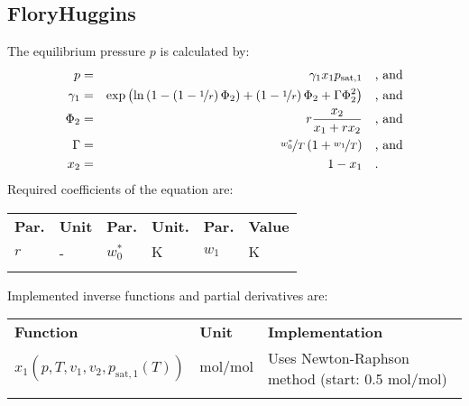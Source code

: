 \subsection{FloryHuggins}
\label{cha:approaches:abs:act:flory_huggins}
%
The equilibrium pressure $p$ is calculated by:
%
\begin{equation*}
	\begin{split}
		p &=& \gamma_1 x_1 p_\mathrm{sat,1} & \quad\text{, and} \\
		\gamma_1 &=& \exp \left( \ln \left( 1 - \left( 1 - \nicefrac{1}{r} \right) \Phi_2  \right) + \left(1 - \nicefrac{1}{r}\right) \Phi_2 + \Gamma \Phi_2 ^2 \right) & \quad\text{, and} \\
		\Phi_2 &=& r \frac{x_2}{x_1 + r x_2} & \quad\text{, and} \\
		\Gamma &=& \nicefrac{w_0^{*}}{T} \left( 1 + \nicefrac{w_1}{T} \right) & \quad\text{, and} \\
		x_2 &=& 1 - x_1  & \quad\text{.} \\
	\end{split}
\end{equation*}
%
Required coefficients of the equation are:
%
\begin{longtable}[l]{ll|ll|ll}
\toprule
\addlinespace
\textbf{Par.} & \textbf{Unit} & \textbf{Par.} &	\textbf{Unit.} & \textbf{Par.} & \textbf{Value} \\
\addlinespace
\midrule
\endhead

\bottomrule
\endfoot
\bottomrule
\endlastfoot
\addlinespace

$r$ & - & $w_0^{*}$ & $\si{\kelvin}$ & $w_1$ & $\si{\kelvin}$ \\

\addlinespace
\end{longtable}
%
Implemented inverse functions and partial derivatives are:
%
\begin{longtable}[l]{l|l|p{7.5cm}}
	\toprule
	\addlinespace
	\textbf{Function} & \textbf{Unit} &	\textbf{Implementation} \\
	\addlinespace
	\midrule
	\endhead
	
	\bottomrule
	\endfoot
	\bottomrule
	\endlastfoot
	\addlinespace
	
	$x_1(p,T,v_1,v_2,p_\mathrm{sat,1}(T))$& $\si{\mole\per\mole}$ & Uses Newton-Raphson method (start: 0.5 $\si{\mole\per\mole}$) \\
	
	\addlinespace
\end{longtable}
%
